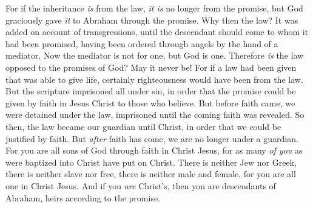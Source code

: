 \begin{biblechapter}
\verse For if the inheritance \textit{is} from the law, \textit{it is} no longer from the promise, but God graciously gave \textit{it} to Abraham through the promise.
 Why then the law? It was added on account of transgressions, until the descendant should come to whom it had been promised, having been ordered through angels by the hand of a mediator.
\verse Now the mediator is not for one, but God is one.
\verse Therefore \textit{is} the law opposed to the promises of God? May it never be! For if a law had been given that was able to give life, certainly righteousness would have been from the law.
\verse But the scripture imprisoned all under sin, in order that the promise could be given by faith in Jesus Christ to those who believe.
\verse But before faith came, we were detained under the law, imprisoned until the coming faith was revealed.
\verse So then, the law became our guardian until Christ, in order that we could be justified by faith.
\verse But \textit{after} faith has come, we are no longer under a guardian.
\verse For you are all sons of God through faith in Christ Jesus,
\verse for as many \textit{of you} as were baptized into Christ have put on Christ.
\verse There is neither Jew nor Greek, there is neither slave nor free, there is neither male and female, for you are all one in Christ Jesus.
\verse And if you \textit{are} Christ’s, then you are descendants of Abraham, heirs according to the promise.
\end{biblechapter}

